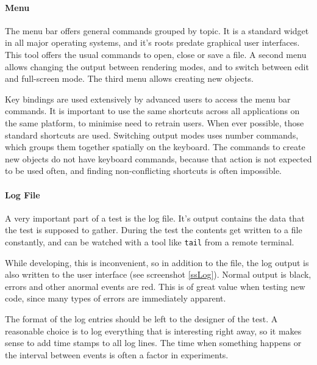 \paragraph{Menu}
The menu bar offers general commands grouped by topic.
It is a standard widget in all major operating systems, and it's roots predate graphical user interfaces.
This tool offers the usual commands to open, close or save a file.
A second menu allows changing the output between rendering modes, and to switch between edit and full-screen mode.
The third menu allows creating new objects.

Key bindings are used extensively by advanced users to access the menu bar commands.
It is important to use the same shortcuts across all applications on the same platform, to minimise need to retrain users.
When ever possible, those standard shortcuts are used.
Switching output modes uses number commands, which groups them together spatially on the keyboard.
The commands to create new objects do not have keyboard commands, because that action is not expected to be used often, and finding non-conflicting shortcuts is often impossible.

\paragraph{Log File}
A very important part of a test is the log file.
It's output contains the data that the test is supposed to gather.
During the test the contents get written to a file constantly, and can be watched with a tool like \texttt{tail} from a remote terminal.

While developing, this is inconvenient, so in addition to the file, the log output is also written to the user interface (see screenshot \ref{ssLog}).
Normal output is black, errors and other anormal events are red.
This is of great value when testing new code, since many types of errors are immediately apparent.

The format of the log entries should be left to the designer of the test.
A reasonable choice is to log everything that is interesting right away, so it makes sense to add time stamps to all log lines.
The time when something happens or the interval between events is often a factor in experiments.

